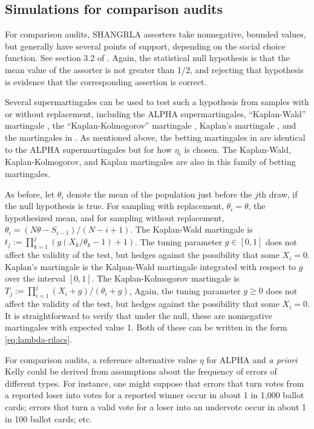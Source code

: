 \documentclass[aoas]{imsart}
\begin{document}
\subsection{Simulations for comparison audits} \label{sec:comparison-audit-sims}

For comparison audits, SHANGRLA assorters take nonnegative, bounded values, but generally have  several points of 
support, depending on the social choice function.
See section 3.2 of \citet{stark20}.
Again, the statistical null hypothesis is that the mean value of the assorter is not greater than 1/2, and rejecting that
hypothesis is evidence that the corresponding assertion is correct.

Several supermartingales can be used to test such a hypothesis from samples with or without replacement, including the ALPHA
supermartingales,
``Kaplan-Wald'' martingale \citep{stark09b}, the ``Kaplan-Kolmogorov'' martingale \citep{starkEvans19,stark20}, Kaplan's martingale 
\citep{starkEvans19,stark20},
and the martingales in \citet{waudby-smithRamdas21,waudby-smithEtal21}.
As mentioned above, the betting martingales in \citet{waudby-smithRamdas21,waudby-smithEtal21} are
identical to the ALPHA supermartingales but for how $\eta_i$ is chosen.
The Kaplan-Wald, Kaplan-Kolmogorov, and Kaplan martingales are also in this family of betting martingales.

As before, let $\theta_i$ denote the mean of the population just before the $j$th draw, if the null hypothesis is true.
For sampling with replacement, $\theta_i = \theta$, the hypothesized mean, and for sampling without replacement,
$\theta_i = (N\theta-S_{i-1})/(N-i+1)$.
The Kaplan-Wald martingale is $t_j := \prod_{k=1}^j \left (g(X_k/\theta_k - 1)+1 \right )$.
The tuning parameter $g \in [0, 1]$ does not affect the validity of the test, but hedges against the possibility that some $X_i = 0$.
Kaplan's martingale is the Kalpan-Wald martingale integrated with respect to $g$ over the interval $[0, 1]$.
The Kaplan-Kolmogorov martingale is $T_j := \prod_{i=1}^j (X_i+g)/(\theta_i+g)$, 
Again, the tuning parameter $g \ge 0$ does not affect the validity of the test, but hedges against the possibility that some $X_i = 0$.
It is straightforward to verify that under the null, these are nonnegative martingales with expected value 1.
Both of these can be written in the form \ref{eq:lambda-rilacs}.

For comparison audits, a reference alternative value $\eta$ for ALPHA and \emph{a priori} Kelly could be derived from assumptions about the 
frequency of errors of different types.
For instance, one might suppose that errors that turn votes from a reported loser 
into votes for a reported winner occur in about 1 in 1,000 ballot cards; errors that turn a valid vote for a loser into an 
undervote occur in about 1 in 100 ballot cards; etc.
\end{document}
